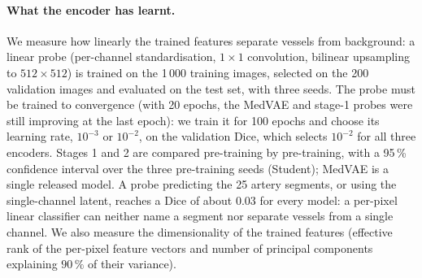 \documentclass[conference]{IEEEtran}
\begin{document}
\paragraph{What the encoder has learnt.}
We measure how linearly the trained features separate vessels from background: a linear probe (per-channel standardisation, $1\times1$ convolution, bilinear upsampling to $512\times512$) is trained on the 1\,000 training images, selected on the 200 validation images and evaluated on the test set, with three seeds. The probe must be trained to convergence (with 20 epochs, the MedVAE and stage-1 probes were still improving at the last epoch): we train it for 100 epochs and choose its learning rate, $10^{-3}$ or $10^{-2}$, on the validation Dice, which selects $10^{-2}$ for all three encoders. Stages 1 and 2 are compared pre-training by pre-training, with a 95\,\% confidence interval over the three pre-training seeds (Student); MedVAE is a single released model. A probe predicting the 25 artery segments, or using the single-channel latent, reaches a Dice of about $0.03$ for every model: a per-pixel linear classifier can neither name a segment nor separate vessels from a single channel. We also measure the dimensionality of the trained features (effective rank of the per-pixel feature vectors and number of principal components explaining $90\,\%$ of their variance).

\begin{table}[htbp]
\centering
{}
\caption{Reconstruction and representation of the three encoders on the 300 ARCADE test images. The probe and the dimensionality are computed on the encoder features before \texttt{conv\_out}, the layer trained by the JEPA loss. Stages 1 and 2: mean ($\pm$ standard deviation) over three pre-trainings; MedVAE: over three probe seeds.}
\label{tab:jepa}
\end{table}
\end{document}
